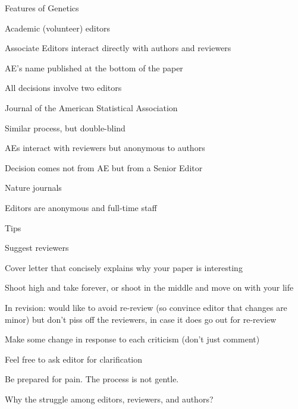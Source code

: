 \documentclass[aspectratio=169,12pt,t]{beamer}
\begin{document}
\begin{frame}{Features of Genetics}

  \bbi
\item Academic (volunteer) editors
\item Associate Editors interact directly with authors and reviewers
\item AE's name published at the bottom of the paper
\item All decisions involve two editors
  \ei


\end{frame}



\begin{frame}{Journal of the American Statistical Association}

  \bbi
\item Similar process, but {\hilit double-blind}
\item AEs interact with reviewers but anonymous to authors
\item Decision comes not from AE but from a Senior Editor
  \ei


\end{frame}


\begin{frame}{Nature journals}

  \bbi
\item Editors are anonymous and full-time staff
  \ei


\end{frame}



\begin{frame}{Tips}

  {\footnotesize

  \bi
  \item Suggest reviewers
  \item Cover letter that concisely explains why your paper is
    interesting
  \item Shoot high and take forever, or
    shoot in the middle and move on with your life
  \item In revision: would like to avoid re-review (so convince editor
    that changes are minor) but don't piss off the reviewers, in case it
    does go out for re-review
  \item Make {\hilit some} change in response to each criticism
    (don't just comment)
  \item Feel free to ask editor for clarification
  \item Be prepared for pain. The process is not gentle.
  \ei
}
\end{frame}



\begin{frame}[c]{}

\centering

{\large \color{title} Why the struggle among editors, reviewers, and authors?}

\end{frame}
\end{document}
